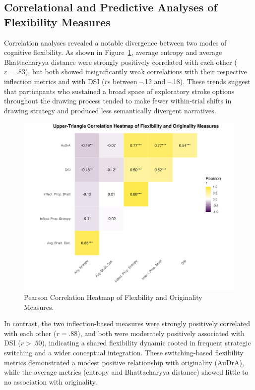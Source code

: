 \documentclass[../MA_Thesis.tex]{subfiles}
\begin{document}
\subsection*{Correlational and Predictive Analyses of Flexibility Measures}

Correlation analyses revealed a notable divergence between two modes of cognitive flexibility. As shown in Figure~\ref{fig:cor_heatmap}, average entropy and average Bhattacharyya distance were strongly positively correlated with each other ($r = .83$), but both showed insignificantly weak correlations with their respective inflection metrics and with DSI ($r$s between –.12 and –.18). These trends suggest that participants who sustained a broad space of exploratory stroke options throughout the drawing process tended to make fewer within-trial shifts in drawing strategy and produced less semantically divergent narratives.

\begin{figure}[H]
  \centering
  \includegraphics[width=\textwidth]{../analysis/results/main_results/correlation/correlation_heatmap.png}
  \caption{
    Pearson Correlation Heatmap of Flexbility and Originality Measures.
  }
  \label{fig:cor_heatmap}
\end{figure}

In contrast, the two inflection-based measures were strongly positively correlated with each other ($r = .88$), and both were moderately positively associated with DSI ($r > .50$), indicating a shared flexibility dynamic rooted in frequent strategic switching and a wider conceptual integration. These switching-based flexibility metrics demonstrated a modest positive relationship with originality (AuDrA), while the average metrics (entropy and Bhattacharyya distance) showed little to no association with originality.
\end{document}
